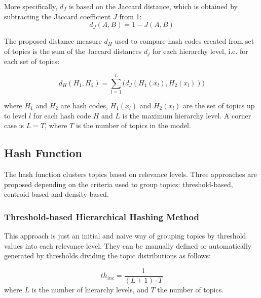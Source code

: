 More specifically, $d_J$ is based on the Jaccard distance, which is obtained by subtracting the Jaccard coefficient $J$ from 1:
\begin{equation}
d_J(A,B) = 1 - J(A,B)
\label{eq:dj}
\end{equation}

The proposed distance measure $d_H$ used to compare hash codes created from set of topics is the sum of the Jaccard distances $d_j$ for each hierarchy level, i.e. for each set of topics:

\begin{equation}
d_H(H_1,H_2) = \sum\limits_{l=1}^L \Big( d_J(H_1(x_l),H_2(x_l)) \Big)
\label{eq:dh}
\end{equation}

where $H_1$ and $H_2$ are hash codes, $H_1(x_l)$ and $H_2(x_l)$ are the set of topics up to level $l$ for each hash code $H$ and $L$ is the maximum hierarchy level. A corner case is $L=T$, where $T$ is the number of topics in the model. 


\subsection{Hash Function}
\label{sec:comparison-hash}

The hash function clusters topics based on relevance levels. Three approaches are proposed depending on the criteria used to group topics: threshold-based, centroid-based and density-based.

\subsubsection{Threshold-based Hierarchical Hashing Method}
\label{sec:comparison-threshold}
This approach is just an initial and naive way of grouping topics by threshold values into each relevance level. They can be manually defined or automatically generated by thresholds dividing the topic distributions as follows:

\begin{equation}
th_{inc} = \frac{1}{(L+1) \cdot T}
\label{eq:th}
\end{equation}
where $L$ is the number of hierarchy levels, and $T$ the number of topics.

